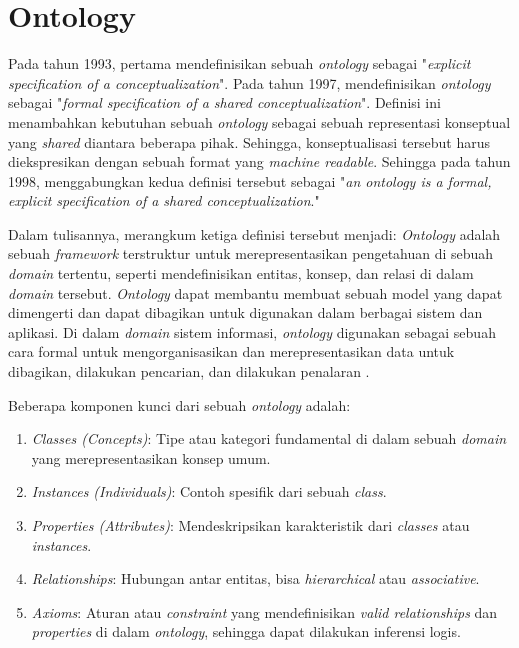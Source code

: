 \section{Ontology}
\label{sec:ontology}

Pada tahun 1993, \cite{gruber1993translation} pertama mendefinisikan sebuah \textit{ontology} sebagai "\textit{explicit specification of a conceptualization}". Pada tahun 1997, \cite{borst1997construction} mendefinisikan \textit{ontology} sebagai "\textit{formal specification of a shared conceptualization}". Definisi ini menambahkan kebutuhan sebuah \textit{ontology} sebagai sebuah representasi konseptual yang \textit{shared} diantara beberapa pihak. Sehingga, konseptualisasi tersebut harus diekspresikan dengan sebuah format yang \textit{machine readable}. Sehingga pada tahun 1998, \cite{studer1998knowledge} menggabungkan kedua definisi tersebut sebagai "\textit{an ontology is a formal, explicit specification of a shared conceptualization}."

Dalam tulisannya, \cite{Guarino2009} merangkum ketiga definisi tersebut menjadi: \textit{Ontology} adalah sebuah \textit{framework} terstruktur untuk merepresentasikan pengetahuan di sebuah \textit{domain} tertentu, seperti mendefinisikan entitas, konsep, dan relasi di dalam \textit{domain} tersebut. \textit{Ontology} dapat membantu membuat sebuah model yang dapat dimengerti dan dapat dibagikan untuk digunakan dalam berbagai sistem dan aplikasi. Di dalam \textit{domain} sistem informasi, \textit{ontology} digunakan sebagai sebuah cara formal untuk mengorganisasikan dan merepresentasikan data untuk dibagikan, dilakukan pencarian, dan dilakukan penalaran \parencite{Guarino2009}. 

Beberapa komponen kunci dari sebuah \textit{ontology} adalah:

\begin{enumerate}
  \item \textit{Classes (Concepts)}: Tipe atau kategori fundamental di dalam sebuah \textit{domain} yang merepresentasikan konsep umum.
  \item \textit{Instances (Individuals)}: Contoh spesifik dari sebuah \textit{class}.
  \item \textit{Properties (Attributes)}: Mendeskripsikan karakteristik dari \textit{classes} atau \textit{instances}.
  \item \textit{Relationships}: Hubungan antar entitas, bisa \textit{hierarchical} atau \textit{associative}.
  \item \textit{Axioms}: Aturan atau \textit{constraint} yang mendefinisikan \textit{valid relationships} dan \textit{properties} di dalam \textit{ontology}, sehingga dapat dilakukan inferensi logis.
\end{enumerate}

